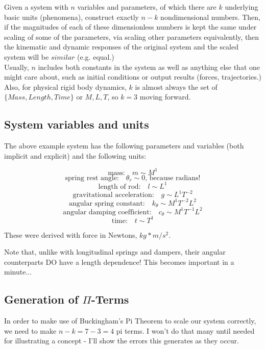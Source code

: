 \documentclass[12pt,letterpaper]{article}
\begin{document}
Given a system with $n$ variables and parameters, of which there are $k$ underlying basic units (phenomena), construct exactly $n-k$ nondimensional numbers.
Then, if the magnitudes of each of these dimensionless numbers is kept the same under scaling of some of the parameters, via scaling other parameters equivalently, then the kinematic and dynamic responses of the original system and the scaled system will be $similar$ (e.g. equal.) \\


Usually, $n$ includes both constants in the system as well as anything else that one might care about, such as initial conditions or output results (forces, trajectories.)
Also, for physical rigid body dynamics, $k$ is almost always the set of $\{Mass, Length, Time\}$ or $M, L, T$, so $k=3$ moving forward.

\subsection{System variables and units}

The above example system has the following parameters and variables (both implicit and explicit) and the following units:

\[
\text{mass:} \quad m \sim M^1
\]
\[
\text{spring rest angle:} \quad \theta_r \sim 0 \text{, because radians!}
\]
\[
\text{length of rod:} \quad l \sim L^1
\]
\[
\text{gravitational acceleration:} \quad g \sim L^1 T^{-2}
\]
\[
\text{angular spring constant:} \quad k_{\theta} \sim M^1 T^{-2} L^2 
\]
\[
\text{angular damping coefficient:} \quad c_{\theta} \sim M^1 T^{-1} L^2
\]
\[
\text{time:} \quad t \sim T^1
\]

These were derived with force in Newtons, $kg*m/s^2$.

Note that, unlike with longitudinal springs and dampers, their angular counterparts DO have a length dependence! This becomes important in a minute...

\subsection{Generation of $\Pi$-Terms}

In order to make use of Buckingham's Pi Theorem to scale our system correctly, we need to make $n-k = 7-3 = 4$ pi terms. I won't do that many until needed for illustrating a concept - I'll show the errors this generates as they occur.
\end{document}
